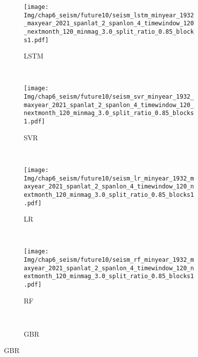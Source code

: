 \begin{figure}[!htbp]
  \vspace{-2cm}
  \centering
  \begin{subfigure}[b]{0.45\textwidth}
    \caption{LSTM}
    \texttt{[image: Img/chap6\_seism/future10/seism\_lstm\_minyear\_1932\_maxyear\_2021\_spanlat\_2\_spanlon\_4\_timewindow\_120\_nextmonth\_120\_minmag\_3.0\_split\_ratio\_0.85\_blocks1.pdf]}
    \vspace{-1cm}
    \label{fig:seism_lstm_minyear_1932_maxyear_2021_spanlat_2_spanlon_4_timewindow_120_nextmonth_120_minmag_3.0_split_ratio_0.85_blocks1}
  \end{subfigure}
  ~
  \begin{subfigure}[b]{0.45\textwidth}
    \caption{SVR} 
    \texttt{[image: Img/chap6\_seism/future10/seism\_svr\_minyear\_1932\_maxyear\_2021\_spanlat\_2\_spanlon\_4\_timewindow\_120\_nextmonth\_120\_minmag\_3.0\_split\_ratio\_0.85\_blocks1.pdf]}
    \vspace{-1cm}
    \label{fig:seism_svr_minyear_1932_maxyear_2021_spanlat_2_spanlon_4_timewindow_120_nextmonth_120_minmag_3.0_split_ratio_0.85_blocks1}
  \end{subfigure}   
  \\
  \begin{subfigure}[b]{0.45\textwidth}
      \caption{LR}
      \vspace{-0.2cm}
      \texttt{[image: Img/chap6\_seism/future10/seism\_lr\_minyear\_1932\_maxyear\_2021\_spanlat\_2\_spanlon\_4\_timewindow\_120\_nextmonth\_120\_minmag\_3.0\_split\_ratio\_0.85\_blocks1.pdf]}
      \vspace{-1cm}
      \label{fig:seism_lr_minyear_1932_maxyear_2021_spanlat_2_spanlon_4_timewindow_120_nextmonth_120_minmag_3.0_split_ratio_0.85_blocks1}
  \end{subfigure}
  ~
  \begin{subfigure}[b]{0.45\textwidth}
    \caption{RF}
    \vspace{-0.2cm}
    \texttt{[image: Img/chap6\_seism/future10/seism\_rf\_minyear\_1932\_maxyear\_2021\_spanlat\_2\_spanlon\_4\_timewindow\_120\_nextmonth\_120\_minmag\_3.0\_split\_ratio\_0.85\_blocks1.pdf]}
    \vspace{-1cm}
    \label{fig:seism_rf_minyear_1932_maxyear_2021_spanlat_2_spanlon_4_timewindow_120_nextmonth_120_minmag_3.0_split_ratio_0.85_blocks1}
  \end{subfigure}
  \\
  \begin{subfigure}[b]{0.45\textwidth}
    \caption{GBR}

\end{subfigure}
\end{figure}
